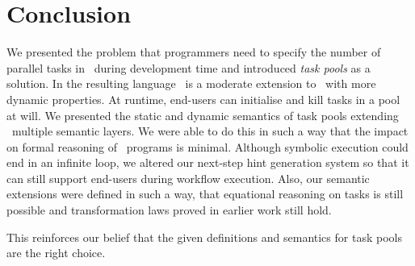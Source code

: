 
\section{Conclusion}
\label{sec:conclusion}

We presented the problem that programmers need to specify the number of parallel tasks in \TOPHAT\ during development time
and introduced \emph{task pools} as a solution.
In the resulting language \DYNTOPHAT\ is a moderate extension to \TOPHAT\ with more dynamic properties.
At runtime, end-users can initialise and kill tasks in a pool at will.
We presented the static and dynamic semantics of task pools extending \TOPHAT\ multiple semantic layers.
We were able to do this in such a way that the impact on formal reasoning of \TOPHAT\ programs is minimal.
Although symbolic execution could end in an infinite loop,
we altered our next-step hint generation system so that it can still support end-users during workflow execution.
Also, our semantic extensions were defined in such a way, that equational reasoning on tasks is still possible
and transformation laws proved in earlier work still hold.

This reinforces our belief that the given definitions and semantics for task pools are the right choice.

